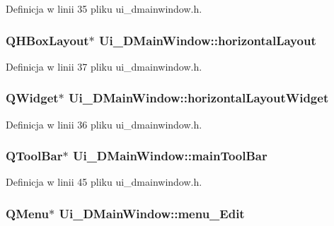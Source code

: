 Definicja w linii 35 pliku ui\-\_\-dmainwindow.\-h.

\hypertarget{class_ui___d_main_window_a4ab6ff85d8c5edef531b3f2111a04157}{
\subsubsection[{horizontal\-Layout}]{\setlength{\rightskip}{0pt plus 5cm}Q\-H\-Box\-Layout$\ast$ Ui\-\_\-\-D\-Main\-Window\-::horizontal\-Layout}}\label{class_ui___d_main_window_a4ab6ff85d8c5edef531b3f2111a04157}


Definicja w linii 37 pliku ui\-\_\-dmainwindow.\-h.

\hypertarget{class_ui___d_main_window_a777a56f3b74aa5b5cd5ff2c62a2968a9}{
\subsubsection[{horizontal\-Layout\-Widget}]{\setlength{\rightskip}{0pt plus 5cm}Q\-Widget$\ast$ Ui\-\_\-\-D\-Main\-Window\-::horizontal\-Layout\-Widget}}\label{class_ui___d_main_window_a777a56f3b74aa5b5cd5ff2c62a2968a9}


Definicja w linii 36 pliku ui\-\_\-dmainwindow.\-h.

\hypertarget{class_ui___d_main_window_a2e1da3781ee1e5913b25b85f4c29b97f}{
\subsubsection[{main\-Tool\-Bar}]{\setlength{\rightskip}{0pt plus 5cm}Q\-Tool\-Bar$\ast$ Ui\-\_\-\-D\-Main\-Window\-::main\-Tool\-Bar}}\label{class_ui___d_main_window_a2e1da3781ee1e5913b25b85f4c29b97f}


Definicja w linii 45 pliku ui\-\_\-dmainwindow.\-h.

\hypertarget{class_ui___d_main_window_a8826a3e34a5aa75fca2b8e45b7010a8b}{
\subsubsection[{menu\-\_\-\-Edit}]{\setlength{\rightskip}{0pt plus 5cm}Q\-Menu$\ast$ Ui\-\_\-\-D\-Main\-Window\-::menu\-\_\-\-Edit}}\label{class_ui___d_main_window_a8826a3e34a5aa75fca2b8e45b7010a8b}


